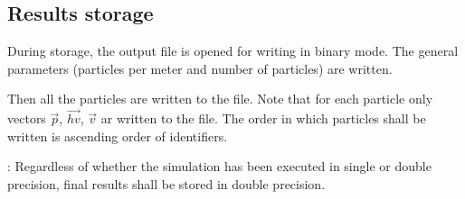 \subsection{Results storage}

During storage, the output file is opened for writing in binary mode.
The general parameters (particles per meter and number of particles) are
written. 

Then all the particles are written to the file. Note that for each particle only
vectors $\vec{p}$, $\vec{hv}$, $\vec{v}$ ar written to the file. The order in
which particles shall be written is ascending order of identifiers.

: Regardless of whether the simulation has been executed in
single or double precision, final results shall be stored in double precision.
